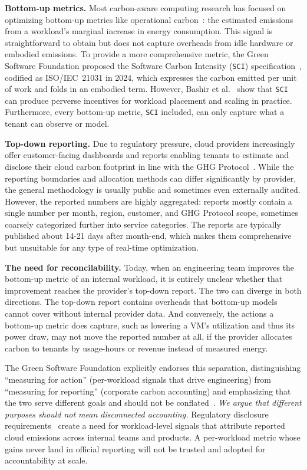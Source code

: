 \documentclass[sigconf]{acmart}
\newcommand{\parag}[1]{\vspace{2mm}\noindent\textbf{#1.}\hspace{2mm}}
\newcommand{\SCI}{\texttt{SCI}\xspace}
\begin{document}
\parag{Bottom-up metrics}
Most carbon-aware computing research has focused on optimizing bottom-up metrics like operational carbon~\cite{radovanovic2022google,hanafy2024gaia,sukprasert2024limits,gsteiger2024caribou,murillo2024cdn,lechowicz2023pause,hanafy2024carbonscaler,wiesner2025qualitytime,wiesner2025moving}: the estimated emissions from a workload's marginal increase in energy consumption.
This signal is straightforward to obtain but does not capture overheads from idle hardware or embodied emissions.
To provide a more comprehensive metric, the Green Software Foundation proposed the Software Carbon Intensity (\SCI) specification~\cite{sci-spec}, codified as ISO/IEC~21031 in 2024, which expresses the carbon emitted per unit of work and folds in an embodied term.
However, Bashir et al.~\cite{bashir2024} show that \SCI can produce perverse incentives for workload placement and scaling in practice.
Furthermore, every bottom-up metric, \SCI included, can only capture what a tenant can observe or model.

\parag{Top-down reporting}
Due to regulatory pressure, cloud providers increasingly offer customer-facing dashboards and reports enabling tenants to estimate and disclose their cloud carbon footprint in line with the GHG Protocol~\cite{ghg-protocol-corp}.
While the reporting boundaries and allocation methods can differ significantly by provider, the general methodology is usually public and sometimes even externally audited.
However, the reported numbers are highly aggregated:
reports mostly contain a single number per month, region, customer, and GHG Protocol scope, sometimes coarsely categorized further into service categories.
The reports are typically published about 14-21 days after month-end, which makes them comprehensive but unsuitable for any type of real-time optimization.

\parag{The need for reconcilability}
Today, when an engineering team improves the bottom-up metric of an internal workload, it is entirely unclear whether that improvement reaches the provider's top-down report.
The two can diverge in both directions.
The top-down report contains overheads that bottom-up models cannot cover without internal provider data.
And conversely, the actions a bottom-up metric does capture, such as lowering a VM's utilization and thus its power draw, may not move the reported number at all, if the provider allocates carbon to tenants by usage-hours or revenue instead of measured energy.

The Green Software Foundation explicitly endorses this separation, distinguishing ``measuring for action'' (per-workload signals that drive engineering) from ``measuring for reporting'' (corporate carbon accounting) and emphasizing that the two serve different goals and should not be conflated~\cite{gsf-measuring}.
\emph{We argue that different purposes should not mean disconnected accounting.}
Regulatory disclosure requirements~\cite{eu2022csrd} create a need for workload-level signals that attribute reported cloud emissions across internal teams and products.
A per-workload metric whose gains never land in official reporting will not be trusted and adopted for accountability at scale.
\end{document}
